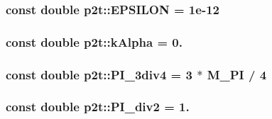 \subsubsection[{E\+P\+S\+I\+L\+O\+N}]{\setlength{\rightskip}{0pt plus 5cm}const double p2t\+::\+E\+P\+S\+I\+L\+O\+N = 1e-\/12}\label{namespacep2t_ac5421d160ad8cd832c3cf6483d378e24}
\hypertarget{namespacep2t_aed2c5457dd827e0781c4dbfa6adfb583}{}
\subsubsection[{k\+Alpha}]{\setlength{\rightskip}{0pt plus 5cm}const double p2t\+::k\+Alpha = 0.}\label{namespacep2t_aed2c5457dd827e0781c4dbfa6adfb583}
\hypertarget{namespacep2t_a8f5d342ebd2614a9169a41fa6952b5f9}{}
\subsubsection[{P\+I\+\_\+3div4}]{\setlength{\rightskip}{0pt plus 5cm}const double p2t\+::\+P\+I\+\_\+3div4 = 3 $\ast$ M\+\_\+\+P\+I / 4}\label{namespacep2t_a8f5d342ebd2614a9169a41fa6952b5f9}
\hypertarget{namespacep2t_abd7f6949620798fa69359d45d8c46f98}{}
\subsubsection[{P\+I\+\_\+div2}]{\setlength{\rightskip}{0pt plus 5cm}const double p2t\+::\+P\+I\+\_\+div2 = 1.}\label{namespacep2t_abd7f6949620798fa69359d45d8c46f98}
